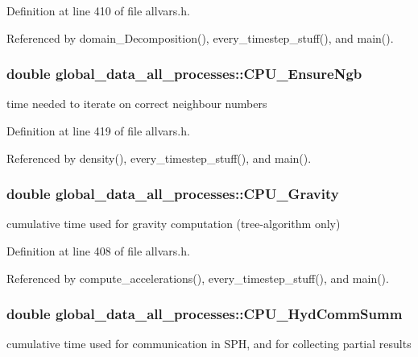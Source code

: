Definition at line 410 of file allvars.h.



Referenced by domain\_\-Decomposition(), every\_\-timestep\_\-stuff(), and main().

\hypertarget{structglobal__data__all__processes_ad3447593858d4165b669b5e70b2521cd}{
\subsubsection[{CPU\_\-EnsureNgb}]{\setlength{\rightskip}{0pt plus 5cm}double {\bf global\_\-data\_\-all\_\-processes::CPU\_\-EnsureNgb}}}
\label{structglobal__data__all__processes_ad3447593858d4165b669b5e70b2521cd}
time needed to iterate on correct neighbour numbers 

Definition at line 419 of file allvars.h.



Referenced by density(), every\_\-timestep\_\-stuff(), and main().

\hypertarget{structglobal__data__all__processes_a27dce58feba6ff0e933ed6f24f857168}{
\subsubsection[{CPU\_\-Gravity}]{\setlength{\rightskip}{0pt plus 5cm}double {\bf global\_\-data\_\-all\_\-processes::CPU\_\-Gravity}}}
\label{structglobal__data__all__processes_a27dce58feba6ff0e933ed6f24f857168}
cumulative time used for gravity computation (tree-\/algorithm only) 

Definition at line 408 of file allvars.h.



Referenced by compute\_\-accelerations(), every\_\-timestep\_\-stuff(), and main().

\hypertarget{structglobal__data__all__processes_ad03842fb23d3c15316ca07c7ac1bce27}{
\subsubsection[{CPU\_\-HydCommSumm}]{\setlength{\rightskip}{0pt plus 5cm}double {\bf global\_\-data\_\-all\_\-processes::CPU\_\-HydCommSumm}}}
\label{structglobal__data__all__processes_ad03842fb23d3c15316ca07c7ac1bce27}
cumulative time used for communication in SPH, and for collecting partial results 

